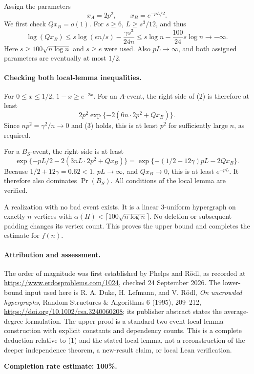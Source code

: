 Assign the parameters
\[
 x_A=2p^2,\qquad x_B=e^{-pL/2}.
\]
We first check \(Qx_B=o(1)\). For \(s\geq6\), \(L\geq s^3/12\), and thus
\[
 \log(Qx_B)
 \leq s\log(en/s)-\frac{\gamma s^3}{24n}
 \leq s\log n-\frac{100}{24}s\log n
 \longrightarrow-\infty. \tag{3}
\]
Here \(s\geq100\sqrt{n\log n}\) and \(s\geq e\) were used. Also \(pL\to\infty\), and both assigned parameters are eventually at most \(1/2\).

\paragraph{Checking both local-lemma inequalities.}
For \(0\leq x\leq1/2\), \(1-x\geq e^{-2x}\). For an \(A\)-event, the right side of (2) is therefore at least
\[
 2p^2\exp\{-2(6n\cdot2p^2+Qx_B)\}.
\]
Since \(np^2=\gamma^2/n\to0\) and (3) holds, this is at least \(p^2\) for sufficiently large \(n\), as required.

For a \(B_S\)-event, the right side is at least
\[
 \exp\{-pL/2-2(3nL\cdot2p^2+Qx_B)\}
 =\exp\{-(1/2+12\gamma)pL-2Qx_B\}.
\]
Because \(1/2+12\gamma=0.62<1\), \(pL\to\infty\), and \(Qx_B\to0\), this is at least \(e^{-pL}\). It therefore also dominates \(\Pr(B_S)\). All conditions of the local lemma are verified.

A realization with no bad event exists. It is a linear 3-uniform hypergraph on exactly \(n\) vertices with
\(\alpha(H)<\lceil100\sqrt{n\log n}\rceil\). No deletion or subsequent padding changes its vertex count. This proves the upper bound and completes the estimate for \(f(n)\).

\paragraph{Attribution and assessment.}
The order of magnitude was first established by Phelps and R\"odl, as recorded at \url{https://www.erdosproblems.com/1024}, checked 24 September 2026. The lower-bound input used here is R. A. Duke, H. Lefmann, and V. R\"odl, \emph{On uncrowded hypergraphs}, Random Structures \& Algorithms 6 (1995), 209--212, \url{https://doi.org/10.1002/rsa.3240060208}; its publisher abstract states the average-degree formulation. The upper proof is a standard two-event local-lemma construction with explicit constants and dependency counts. This is a complete deduction relative to (1) and the stated local lemma, not a reconstruction of the deeper independence theorem, a new-result claim, or local Lean verification.

\textbf{Completion rate estimate: 100\%.}
